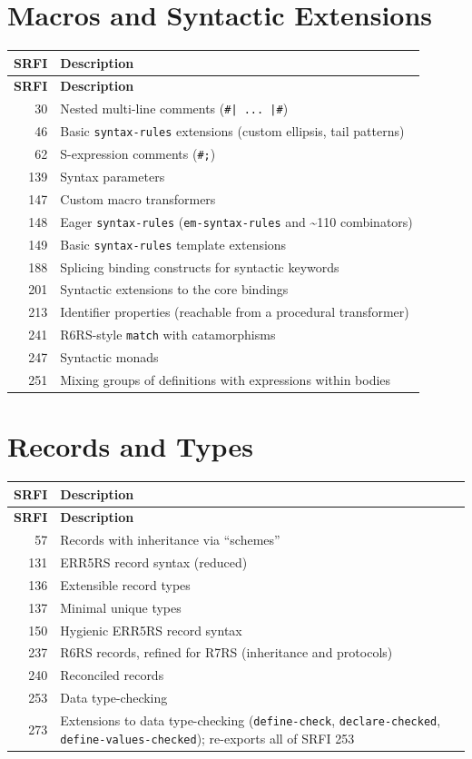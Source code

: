 \section{Macros and Syntactic Extensions}

\begin{longtable}{rp{9cm}}
\textbf{SRFI} & \textbf{Description} \\
\hline
\endfirsthead
\textbf{SRFI} & \textbf{Description} \\
\hline
\endhead
30 & Nested multi-line comments (\texttt{\#| ... |\#}) \\
46 & Basic \texttt{syntax-rules} extensions (custom ellipsis, tail patterns) \\
62 & S-expression comments (\texttt{\#;}) \\
139 & Syntax parameters \\
147 & Custom macro transformers \\
148 & Eager \texttt{syntax-rules} (\texttt{em-syntax-rules} and \textasciitilde 110 combinators) \\
149 & Basic \texttt{syntax-rules} template extensions \\
188 & Splicing binding constructs for syntactic keywords \\
201 & Syntactic extensions to the core bindings \\
213 & Identifier properties (reachable from a procedural transformer) \\
241 & R6RS-style \texttt{match} with catamorphisms \\
247 & Syntactic monads \\
251 & Mixing groups of definitions with expressions within bodies \\
\end{longtable}

\section{Records and Types}

\begin{longtable}{rp{9cm}}
\textbf{SRFI} & \textbf{Description} \\
\hline
\endfirsthead
\textbf{SRFI} & \textbf{Description} \\
\hline
\endhead
57 & Records with inheritance via ``schemes'' \\
131 & ERR5RS record syntax (reduced) \\
136 & Extensible record types \\
137 & Minimal unique types \\
150 & Hygienic ERR5RS record syntax \\
237 & R6RS records, refined for R7RS (inheritance and protocols) \\
240 & Reconciled records \\
253 & Data type-checking \\
273 & Extensions to data type-checking (\texttt{define-check}, \texttt{declare-checked}, \texttt{define-values-checked}); re-exports all of SRFI 253 \\
\end{longtable}

